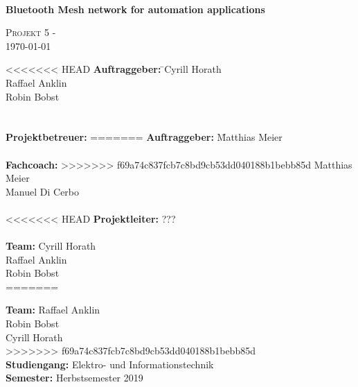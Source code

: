 \documentclass[final]{fhnwreport}       %
\begin{document}
	\begin{center}
		\vspace*{2cm}
		{\huge{\textbf{\thetitle}}}\\
		\vspace*{0.5cm}
		
		{\huge{\textbf{Bluetooth Mesh network for automation applications}}}\\
		\vspace*{0.5cm}
		
		{\scshape\Large Projekt 5 - \theauthor \\} \Large{\today}
		\vfill
		\begin{normalsize}
			{\begin{tabbing}
<<<<<<< HEAD
					\textbf{Auftraggeber:} \hspace{5cm}\= 
					\>Cyrill Horath \\ 
					\>Raffael Anklin \\ 
					\>Robin Bobst \\ 
					\\[0.8cm]
					
					\\[0.8cm]
					\textbf{Projektbetreuer:} 
=======
					\textbf{Auftraggeber:} \hspace{5cm}\= Matthias Meier\\
					
					\\[0.8cm]
					\textbf{Fachcoach:} 
>>>>>>> f69a74c837fcb7c8bd9cb53dd040188b1bebb85d
					\>Matthias Meier\\
					\>Manuel Di Cerbo\\
					
					\\[0.4cm]
<<<<<<< HEAD
					\textbf{Projektleiter:} \>???\\
					\\[0.4cm]
					
					\textbf{Team:} 
					\>Cyrill Horath \\ 
					\>Raffael Anklin \\ 
					\>Robin Bobst \\ 
=======

					
					\textbf{Team:} \>Raffael Anklin \\ \>Robin Bobst \\ \>Cyrill Horath \\ 
>>>>>>> f69a74c837fcb7c8bd9cb53dd040188b1bebb85d
					\\[0.8cm]
					
					\textbf{Studiengang:} \>Elektro- und Informationstechnik
					\\[0.8cm]	\textbf{Semester:} \>Herbstsemester 2019
			\end{tabbing}}
		\end{normalsize}
		\vfill
	\end{center}
\clearpage
\end{document}
